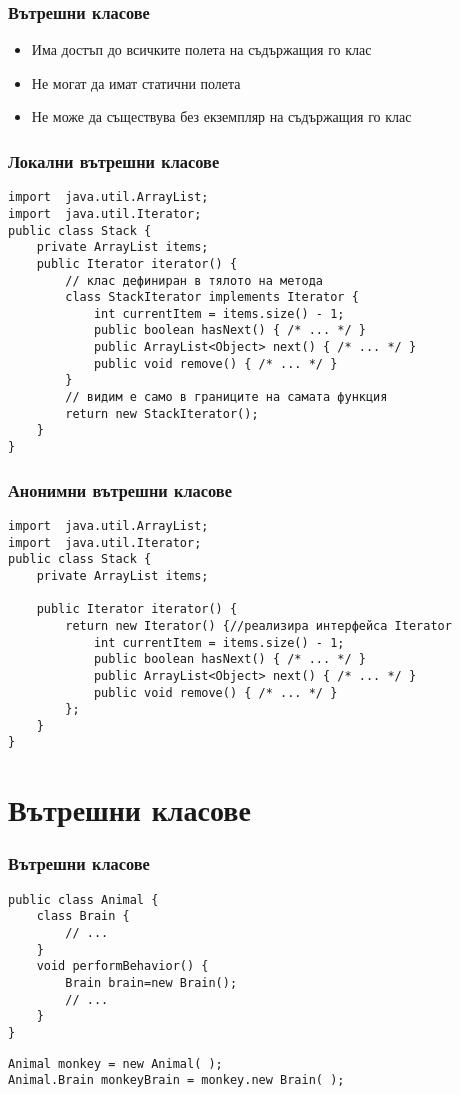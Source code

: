 \documentclass[ignorenonframetext, hyperref=unicode,compress,pdflatex]{beamer}
\begin{document}
\begin{frame}[containsverbatim]\frametitle{Вътрешни класове}
\begin{itemize}
\item Има достъп до всичките полета на съдържащия го клас
\item Не могат да имат статични полета
\item Не може да съществува без екземпляр на съдържащия го клас
\end{itemize}

\end{frame}

\begin{frame}[containsverbatim]\frametitle{Локални вътрешни класове}
\begin{lstlisting}
import  java.util.ArrayList;
import  java.util.Iterator;
public class Stack {
 	private ArrayList items;
 	public Iterator iterator() {
		// клас дефиниран в тялото на метода
 		class StackIterator implements Iterator {
 			int currentItem = items.size() - 1;
 			public boolean hasNext() { /* ... */ }
 			public ArrayList<Object> next() { /* ... */ }
 			public void remove() { /* ... */ }
		}
		// видим е само в границите на самата функция
 		return new StackIterator();
	}
}
\end{lstlisting}
\end{frame}

\begin{frame}[containsverbatim]\frametitle{Анонимни вътрешни класове}
\begin{lstlisting}
import  java.util.ArrayList;
import  java.util.Iterator;
public class Stack {
 	private ArrayList items;

 	public Iterator iterator() {
 		return new Iterator() {//реализира интерфейса Iterator
 			int currentItem = items.size() - 1;
 			public boolean hasNext() { /* ... */ }
 			public ArrayList<Object> next() { /* ... */ }
 			public void remove() { /* ... */ }
		};
	}
}
\end{lstlisting}
\end{frame}

\section{Вътрешни класове}

\begin{frame}[containsverbatim]\frametitle{Вътрешни класове}
\begin{lstlisting}
public class Animal {
	class Brain {
		// ...
	}
	void performBehavior() {
		Brain brain=new Brain();
		// ...
	}
}
\end{lstlisting}

\begin{lstlisting}
Animal monkey = new Animal( );
Animal.Brain monkeyBrain = monkey.new Brain( );
\end{lstlisting}
\end{frame}
\end{document}
